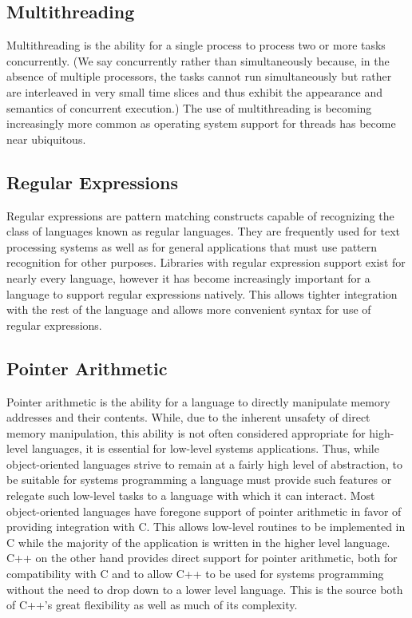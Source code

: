 \documentclass[12pt,a4paper,final,twoside,onecolumn,titlepage]{book}
\begin{document}
\subsection{Multithreading}
Multithreading is the ability for a single process to process two or more tasks concurrently. (We say concurrently rather than simultaneously because, in the absence of multiple processors, the tasks cannot run simultaneously but rather are interleaved in very small time slices and thus exhibit the appearance and semantics of concurrent execution.) The use of multithreading is becoming increasingly more common as operating system support for threads has become near ubiquitous.

\subsection{Regular Expressions}
Regular expressions are pattern matching constructs capable of recognizing the class of languages known as regular languages. They are frequently used for text processing systems as well as for general applications that must use pattern recognition for other purposes. Libraries with regular expression support exist for nearly every language, however it has become increasingly important for a language to support regular expressions natively. This allows tighter integration with the rest of the language and allows more convenient syntax for use of regular expressions. 

\subsection{Pointer Arithmetic}
Pointer arithmetic is the ability for a language to directly manipulate memory addresses and their contents. While, due to the inherent unsafety of direct memory manipulation, this ability is not often considered appropriate for high-level languages, it is essential for low-level systems applications. Thus, while object-oriented languages strive to remain at a fairly high level of abstraction, to be suitable for systems programming a language must provide such features or relegate such low-level tasks to a language with which it can interact. Most object-oriented languages have foregone support of pointer arithmetic in favor of providing integration with C. This allows low-level routines to be implemented in C while the majority of the application is written in the higher level language. C++ on the other hand provides direct support for pointer arithmetic, both for compatibility with C and to allow C++ to be used for systems programming without the need to drop down to a lower level language. This is the source both of C++'s great flexibility as well as much of its complexity.
\end{document}
